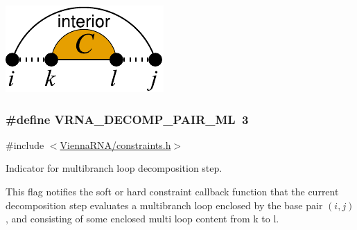  
\begin{DoxyImageNoCaption}
  \mbox{\includegraphics[width=\textwidth,height=\textheight/2,keepaspectratio=true]{decomp_il}}
\end{DoxyImageNoCaption}
 \hypertarget{group__constraints_gaa15b1185673f0b9e900c4748d45f388f}{}
\subsubsection[{V\+R\+N\+A\+\_\+\+D\+E\+C\+O\+M\+P\+\_\+\+P\+A\+I\+R\+\_\+\+M\+L}]{\setlength{\rightskip}{0pt plus 5cm}\#define V\+R\+N\+A\+\_\+\+D\+E\+C\+O\+M\+P\+\_\+\+P\+A\+I\+R\+\_\+\+M\+L~3}\label{group__constraints_gaa15b1185673f0b9e900c4748d45f388f}


{\ttfamily \#include $<$\hyperlink{constraints_8h}{Vienna\+R\+N\+A/constraints.\+h}$>$}



Indicator for multibranch loop decomposition step. 

This flag notifies the soft or hard constraint callback function that the current decomposition step evaluates a multibranch loop enclosed by the base pair $(i,j)$, and consisting of some enclosed multi loop content from k to l.

